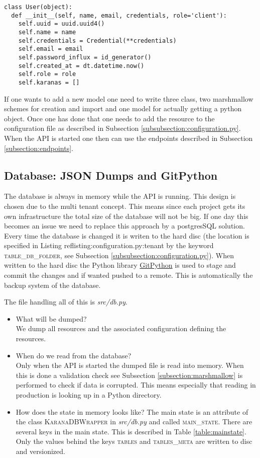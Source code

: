 \begin{lstlisting}[caption={Example for a marshmallow scheme, here user},label={listing:usermodel}]
class User(object):
  def __init__(self, name, email, credentials, role='client'):
    self.uuid = uuid.uuid4()
    self.name = name
    self.credentials = Credential(**credentials)
    self.email = email
    self.password_influx = id_generator()
    self.created_at = dt.datetime.now()
    self.role = role
    self.karanas = []  
\end{lstlisting}

If one wants to add a new model one need to write three class, two marshmallow schemes for creation and import and one model for actually getting a python object. Once one has done that one needs to add the resource to the configuration file as described in Subsection \ref{subsubsection:configuration.py}. When the API is started one then can use the endpoints described in Subsection \ref{subsection:endpoints}. 

\subsection{Database: JSON Dumps and GitPython}
The database is always in memory while the API is running. This design is chosen due to the multi tenant concept. This means since each project gets its own infrastructure the total size of the database will not be big. If one day this becomes an issue we need to replace this approach by a postgresSQL solution. Every time the database is changed it is writen to the hard disc (the location is specified in Listing ref{listing:configuration.py:tenant} by the keyword \textsc{table\_db\_folder}, see Subsection \ref{subsubsection:configuration.py}). When written to the hard disc the Python library \href{https://github.com/gitpython-developers/GitPython}{GitPython} is used to stage and commit the changes and if wanted pushed to a remote. This is automatically the backup system of the database. 

The file handling all of this is \textit{src/db.py}.
\begin{itemize}
	\item What will be dumped? \\
		We dump all resources and the associated configuration defining the resources.
	\item When do we read from the database? \\
		Only when the API is started the dumped file is read into memory. When this is done a validation check see Subsection \ref{subsection:marshmallow} is performed to check if data is corrupted. This means especially that reading in production is looking up in a Python directory.
	\item How does the state in memory looks like?
		The main state is an attribute of the class \textsc{KaranaDBWrapper} in \textit{src/db.py} and called \textsc{main\_state}. There are several keys in the main state. This is described in Table \ref{table:mainstate}. Only the values behind the keys \textsc{tables} and \textsc{tables\_meta} are written to disc and versionized.
\end{itemize}

